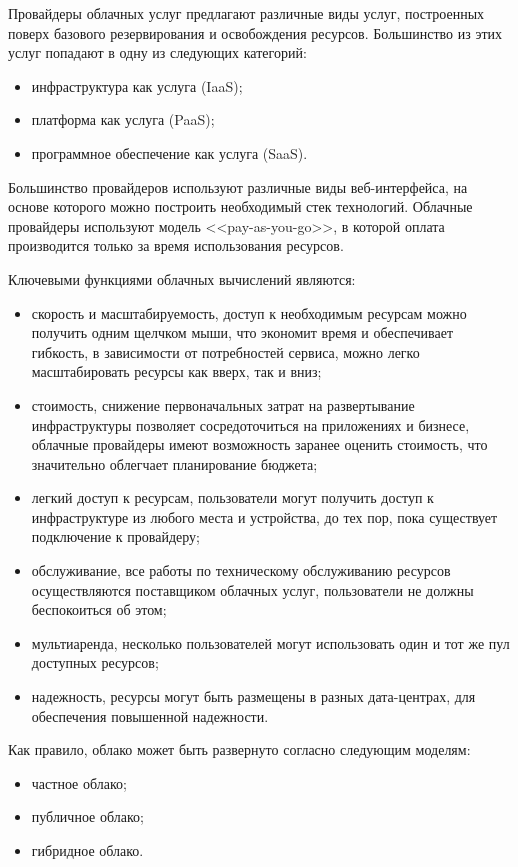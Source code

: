 
Провайдеры облачных услуг предлагают различные виды услуг, построенных поверх базового резервирования и освобождения ресурсов.
Большинство из этих услуг попадают в одну из следующих категорий:
\begin{itemize}
  \item инфраструктура как услуга (IaaS);
  \item платформа как услуга (PaaS);
  \item программное обеспечение как услуга (SaaS).
\end{itemize}


Большинство провайдеров используют различные виды веб-интерфейса, на основе которого можно построить необходимый стек технологий.
Облачные провайдеры используют модель <<pay-as-you-go>>, в которой оплата производится только за время использования ресурсов.

Ключевыми функциями облачных вычислений являются:
\begin{itemize}
  \item скорость и масштабируемость, доступ к необходимым ресурсам можно получить одним щелчком мыши, что экономит время и обеспечивает гибкость, в зависимости от потребностей сервиса, можно легко масштабировать ресурсы как вверх, так и вниз;
  \item стоимость, снижение первоначальных затрат на развертывание инфраструктуры позволяет сосредоточиться на приложениях и бизнесе, облачные провайдеры имеют возможность заранее оценить стоимость, что значительно облегчает планирование бюджета;
  \item легкий доступ к ресурсам, пользователи могут получить доступ к инфраструктуре из любого места и устройства, до тех пор, пока существует подключение к провайдеру;
  \item обслуживание, все работы по техническому обслуживанию ресурсов осуществляются поставщиком облачных услуг, пользователи не должны беспокоиться об этом;
  \item мультиаренда, несколько пользователей могут использовать один и тот же пул доступных ресурсов;
  \item надежность, ресурсы могут быть размещены в разных дата-центрах, для обеспечения повышенной надежности.
\end{itemize}

Как правило, облако может быть развернуто согласно следующим моделям:
\begin{itemize}
  \item частное облако;
  \item публичное облако;
  \item гибридное облако.
\end{itemize}

